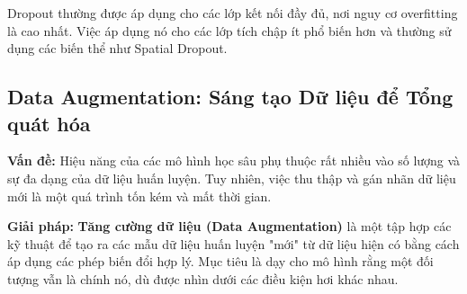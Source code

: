 Dropout thường được áp dụng cho các lớp kết nối đầy đủ, nơi nguy cơ overfitting là cao nhất. Việc áp dụng nó cho các lớp tích chập ít phổ biến hơn và thường sử dụng các biến thể như Spatial Dropout.

\subsection{Data Augmentation: Sáng tạo Dữ liệu để Tổng quát hóa}
\label{subsec:data_augmentation}
\textbf{Vấn đề:} Hiệu năng của các mô hình học sâu phụ thuộc rất nhiều vào số lượng và sự đa dạng của dữ liệu huấn luyện. Tuy nhiên, việc thu thập và gán nhãn dữ liệu mới là một quá trình tốn kém và mất thời gian.

\textbf{Giải pháp:} \textbf{Tăng cường dữ liệu (Data Augmentation)} là một tập hợp các kỹ thuật để tạo ra các mẫu dữ liệu huấn luyện "mới" từ dữ liệu hiện có bằng cách áp dụng các phép biến đổi hợp lý. Mục tiêu là dạy cho mô hình rằng một đối tượng vẫn là chính nó, dù được nhìn dưới các điều kiện hơi khác nhau.

